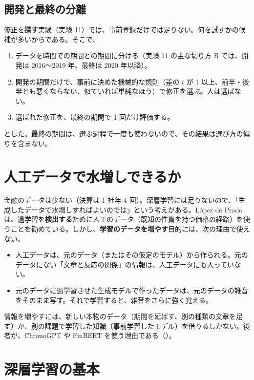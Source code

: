 \subsection{開発と最終の分離}

修正を\textbf{探す}実験（実験 11）では、事前登録だけでは足りない。何を試すかの候補が多いからである。そこで、
\begin{enumerate}
\item データを時間での期間との期間に分ける（実験 11 の主な切り方 B では、開発は 2016〜2019 年、最終は 2020 年以降）。
\item 開発の期間だけで、事前に決めた機械的な規則（差の $t$ が 1 以上、前半・後半とも悪くならない、似ていれば単純なほう）で修正を選ぶ。人は選ばない。
\item 選ばれた修正を、最終の期間で 1 回だけ評価する。
\end{enumerate}
とした。最終の期間は、選ぶ過程で一度も使わないので、その結果は選び方の偏りを含まない。

\section{人工データで水増しできるか}

金融のデータは少ない（決算は 1 社年 4 回）。深層学習には足りないので、「生成したデータで水増しすればよいのでは」という考えがある。López de Prado は、過学習を\textbf{検出する}ために人工のデータ（既知の性質を持つ価格の経路）を使うことを勧めている。しかし、\textbf{学習のデータを増やす}目的には、次の理由で使えない。

\begin{itemize}
\item 人工データは、元のデータ（またはその仮定のモデル）から作られる。元のデータにない「文章と反応の関係」の情報は、人工データにも入っていない。
\item 元のデータに過学習させた生成モデルで作ったデータは、元のデータの雑音をそのまま写す。それで学習すると、雑音をさらに強く覚える。
\end{itemize}

情報を増やすには、新しい本物のデータ（期間を延ばす、別の種類の文章を足す）か、別の課題で学習した知識（事前学習したモデル）を借りるしかない。後者が、ChronoGPT や FinBERT を使う理由である（）。

\section{深層学習の基本}

